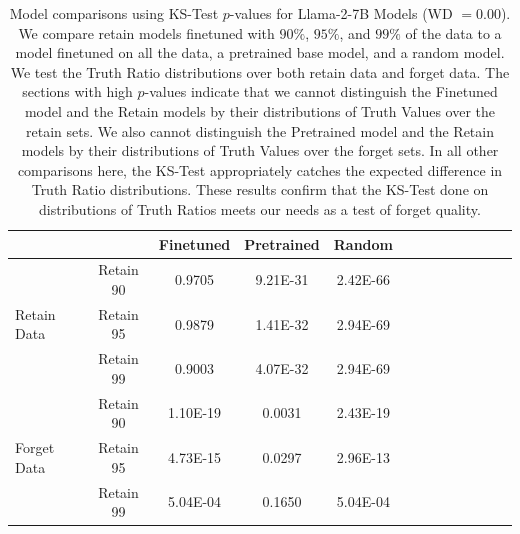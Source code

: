 \begin{table}[t!]
\centering
\caption{Model comparisons using KS-Test $p$-values for Llama-2-7B Models (WD $= 0.00$). We compare retain models finetuned with $90\%$, $95\%$, and $99\%$ of the data to a model finetuned on all the \tofu{} data, a pretrained base model, and a random model. We test the Truth Ratio distributions over both retain data and forget data. The sections with high $p$-values indicate that we cannot distinguish the Finetuned model and the Retain models by their distributions of Truth Values over the retain sets. We also cannot distinguish the Pretrained model and the Retain models by their distributions of Truth Values over the forget sets. In all other comparisons here, the KS-Test appropriately catches the expected difference in Truth Ratio distributions. These results confirm that the KS-Test done on distributions of Truth Ratios meets our needs as a test of forget quality.}
\label{tab:llama-pvals-2}
\footnotesize
\begin{tabular}{lcccccccccccc}
\toprule
         & & Finetuned & Pretrained & Random \\
\midrule
                & Retain 90 & 0.9705      & 9.21E-31      & 2.42E-66  \\
Retain Data     & Retain 95 & 0.9879      & 1.41E-32      & 2.94E-69  \\
                & Retain 99 & 0.9003      & 4.07E-32      & 2.94E-69  \\ 
\midrule
                & Retain 90  & 1.10E-19     & 0.0031       & 2.43E-19  \\
Forget Data     & Retain 95  & 4.73E-15     & 0.0297       & 2.96E-13  \\
                & Retain 99  & 5.04E-04     & 0.1650       & 5.04E-04  \\ 
\bottomrule
\end{tabular}
\end{table}




